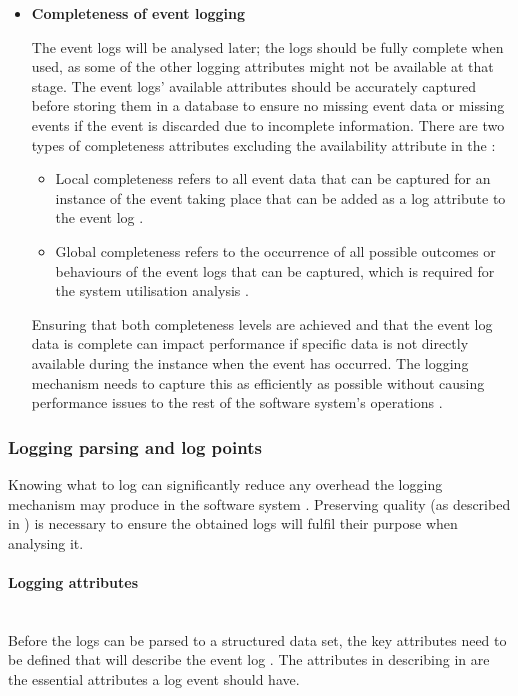 \begin{itemize}
	\item \textbf{Completeness of event logging}\par The event logs will be analysed later; the logs should be fully complete when used, as some of the other logging attributes might not be available at that stage. The event logs' available attributes should be accurately captured before storing them in a database to ensure no missing event data or missing events if the event is discarded due to incomplete information. There are two types of completeness attributes excluding the availability attribute in the :

	\begin{itemize}
		\item Local completeness refers to all event data that can be captured for an instance of the event taking place that can be added as a log attribute to the event log \cite{Kherbouche2017, VanDerAalst2004}.
		\item Global completeness refers to the occurrence of all possible outcomes or behaviours of the event logs that can be captured, which is required for the system utilisation analysis \cite{Kherbouche2017, VanDerAalst2004}.
	\end{itemize}

	Ensuring that both completeness levels are achieved and that the event log data is complete can impact performance if specific data is not directly available during the instance when the event has occurred. The logging mechanism needs to capture this as efficiently as possible without causing performance issues to the rest of the software system's operations \cite{Zhu2015, Zhu2019}. 
\end{itemize}

\subsubsection{Logging parsing and log points}\label{sec:ch1_loggignPoints}
Knowing what to log can significantly reduce any overhead the logging mechanism may produce in the software system \cite{Jia2018, Pecchia2015}. Preserving quality (as described in ) is necessary to ensure the obtained logs will fulfil their purpose when analysing it.

\paragraph{Logging attributes}\leavevmode\\
Before the logs can be parsed to a structured data set, the key attributes need to be defined that will describe the event log \cite{Bekeneva2020}. The attributes in describing in  are the essential attributes a log event should have. 

